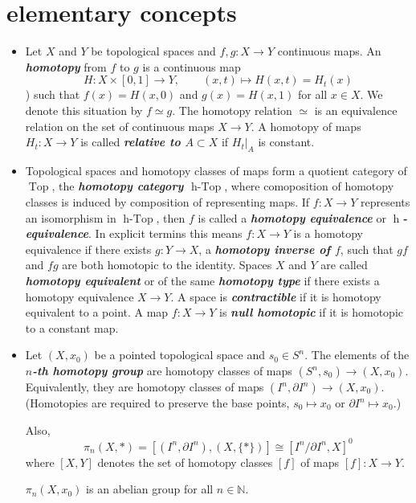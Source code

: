 \documentclass{article}
\numberwithin{equation}{section}
\newcommand{\N}{\mathbb{N}}
\DeclareMathOperator{\hTop}{h-Top}
\DeclareMathOperator{\Top}{Top}
\begin{document}
\section{elementary concepts}
\begin{defn}\leavevmode
	\begin{itemize}
		\item Let $X$ and $Y$ be topological spaces and $f,g:X\to Y$ continuous maps. An \textbf{\textit{homotopy}} from $f$ to $g$ is a continuous map
		\[H:X\times[0,1]\to Y,\qquad(x,t)\mapsto H(x,t)=H_t(x)\])
		such that $f(x)=H(x,0)$ and $g(x)=H(x,1)$ for all $x\in X$. We denote this situation by $f\simeq g$. The homotopy relation $\simeq$ is an equivalence relation on the set of continuous maps $X\to Y$. A homotopy of maps $H_t:X\to Y$ is called \textbf{\textit{relative to $A\subset X$}} if $H_t|_A$ is constant.
		
		\item Topological spaces and homotopy classes of maps form a quotient category of $\Top$, the \textbf{\textit{homotopy category $\hTop$}}, where comoposition of homotopy classes is induced by composition of representing maps. If $f:X\to Y$ represents an isomorphism in $\hTop$, then $f$ is called a \textbf{\textit{homotopy equivalence}} or \textbf{\textit{$\operatorname{h}$-equivalence}}. In explicit termins this means $f:X\to Y$ is a homotopy equivalence if there exists $g:Y\to X$, a \textbf{\textit{homotopy inverse of $f$}}, such that $gf$ and $fg$ are both homotopic to the identity. Spaces $X$ and $Y$ are called \textbf{\textit{homotopy equivalent}} or of the same \textbf{\textit{homotopy type}} if there exists a homotopy equivalence $X\to Y$. A space is \textbf{\textit{contractible}} if it is homotopy equivalent to a point. A map $f:X\to Y$ is \textbf{\textit{null homotopic}} if it is homotopic to a constant map.
		
		\item Let $(X,x_0)$ be a pointed topological space and $s_0\in S^n$. The elements of the \textbf{\textit{$n$-th homotopy group}} are homotopy classes of maps $(S^n,s_0)\to (X,x_0)$. Equivalently, they are homotopy classes of maps $(I^n,\partial I^n)\to (X,x_0)$. (Homotopies are required to preserve the base points, $s_0\mapsto x_0$ or $\partial I^n\mapsto x_0$.)
		
		Also,
		\[\pi_n(X,*)=[(I^n,\partial I^n),(X,\{*\})]\cong[I^n/\partial I^n,X]^0\]
		where $[X,Y]$ denotes the set of homotopy classes $[f]$ of maps $[f]:X\to Y$.
		\begin{prop}
			$\pi_n(X,x_0)$ is an abelian group for all $n\in\N$.
		\end{prop}
				

\end{itemize}
\end{defn}
\end{document}

